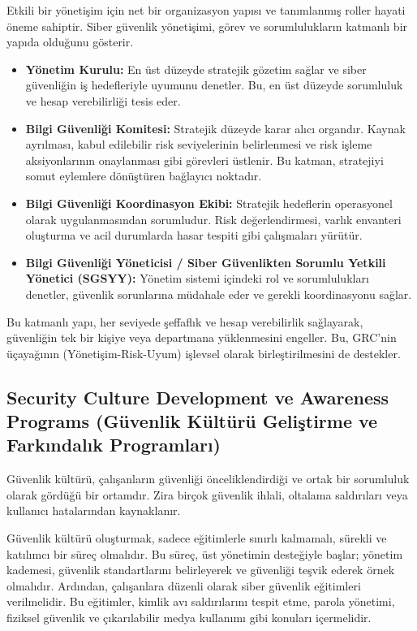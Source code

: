 Etkili bir yönetişim için net bir organizasyon yapısı ve tanımlanmış roller hayati öneme sahiptir. Siber güvenlik yönetişimi, görev ve sorumlulukların katmanlı bir yapıda olduğunu gösterir.
\begin{itemize}
    \item \textbf{Yönetim Kurulu:} En üst düzeyde stratejik gözetim sağlar ve siber güvenliğin iş hedefleriyle uyumunu denetler. Bu, en üst düzeyde sorumluluk ve hesap verebilirliği tesis eder.
    \item \textbf{Bilgi Güvenliği Komitesi:} Stratejik düzeyde karar alıcı organdır. Kaynak ayrılması, kabul edilebilir risk seviyelerinin belirlenmesi ve risk işleme aksiyonlarının onaylanması gibi görevleri üstlenir. Bu katman, stratejiyi somut eylemlere dönüştüren bağlayıcı noktadır.
    \item \textbf{Bilgi Güvenliği Koordinasyon Ekibi:} Stratejik hedeflerin operasyonel olarak uygulanmasından sorumludur. Risk değerlendirmesi, varlık envanteri oluşturma ve acil durumlarda hasar tespiti gibi çalışmaları yürütür.
    \item \textbf{Bilgi Güvenliği Yöneticisi / Siber Güvenlikten Sorumlu Yetkili Yönetici (SGSYY):} Yönetim sistemi içindeki rol ve sorumlulukları denetler, güvenlik sorunlarına müdahale eder ve gerekli koordinasyonu sağlar.
\end{itemize}

Bu katmanlı yapı, her seviyede şeffaflık ve hesap verebilirlik sağlayarak, güvenliğin tek bir kişiye veya departmana yüklenmesini engeller. Bu, GRC'nin üçayağının (Yönetişim-Risk-Uyum) işlevsel olarak birleştirilmesini de destekler.

\subsection{Security Culture Development ve Awareness Programs (Güvenlik Kültürü Geliştirme ve Farkındalık Programları)}

Güvenlik kültürü, çalışanların güvenliği önceliklendirdiği ve ortak bir sorumluluk olarak gördüğü bir ortamdır. Zira birçok güvenlik ihlali, oltalama saldırıları veya kullanıcı hatalarından kaynaklanır.

Güvenlik kültürü oluşturmak, sadece eğitimlerle sınırlı kalmamalı, sürekli ve katılımcı bir süreç olmalıdır. Bu süreç, üst yönetimin desteğiyle başlar; yönetim kademesi, güvenlik standartlarını belirleyerek ve güvenliği teşvik ederek örnek olmalıdır. Ardından, çalışanlara düzenli olarak siber güvenlik eğitimleri verilmelidir. Bu eğitimler, kimlik avı saldırılarını tespit etme, parola yönetimi, fiziksel güvenlik ve çıkarılabilir medya kullanımı gibi konuları içermelidir.

